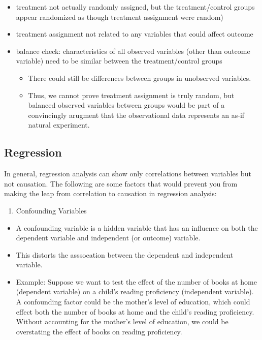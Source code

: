 \documentclass[]{book}
\providecommand{\tightlist}{%
  \setlength{\itemsep}{0pt}\setlength{\parskip}{0pt}}
\begin{document}
\begin{itemize}
\begin{enumerate}
    \begin{itemize}
    \tightlist
    \item
      treatment not actually randomly assigned, but the treatment/control groups appear randomized as though treatment assignment were random)
    \item
      treatment assignment not related to any variables that could affect outcome
    \item
      balance check: characteristics of all observed variables (other than outcome variable) need to be similar between the treatment/control groups

      \begin{itemize}
      \tightlist
      \item
        There could still be differences between groups in unobserved variables.
      \item
        Thus, we cannot prove treatment assignment is truly random, but balanced observed variables between groups would be part of a convincingly arugment that the observational data represents an as-if natural experiment.
      \end{itemize}
    \end{itemize}
  \end{enumerate}
\end{itemize}

\hypertarget{regression}{%
\subsection{Regression}\label{regression}}

In general, regression analysis can show only correlations between variables but not causation. The following are some factors that would prevent you from making the leap from correlation to causation in regression analysis:

\begin{enumerate}
\def\labelenumi{\arabic{enumi}.}
\tightlist
\item
  Confounding Variables
\end{enumerate}

\begin{itemize}
\tightlist
\item
  A confounding variable is a hidden variable that has an influence on both the dependent variable and independent (or outcome) variable.
\item
  This distorts the asssocation between the dependent and independent variable.
\item
  Example: Suppose we want to test the effect of the number of books at home (dependent variable) on a child's reading proficiency (independent variable). A confounding factor could be the mother's level of education, which could effect both the number of books at home and the child's reading proficiency. Without accounting for the mother's level of education, we could be overstating the effect of books on reading proficiency.
\end{itemize}
\end{document}
